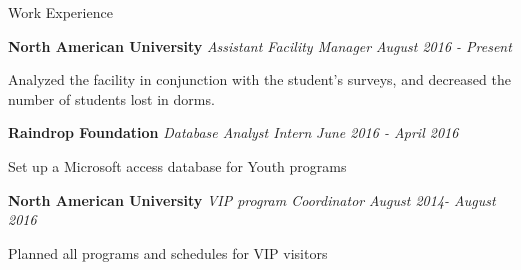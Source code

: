 \documentclass[10pt]{resume} %
\begin{document}
\begin{rSection}{Work Experience} \itemsep -2pt


{\bf North American University} \textit{Assistant Facility Manager} \hfill {\em August 2016 - Present} 
\item Analyzed the facility in conjunction with the student’s surveys, and decreased the number of students lost in dorms.

{\bf Raindrop Foundation} \textit{Database Analyst Intern} \hfill {\em June 2016 - April 2016} 
\item Set up a Microsoft access database for Youth programs


{\bf North American University} \textit{VIP program Coordinator} \hfill {\em August 2014- August 2016} 
\item Planned all programs and schedules for VIP visitors 


\end{rSection}
\end{document}
